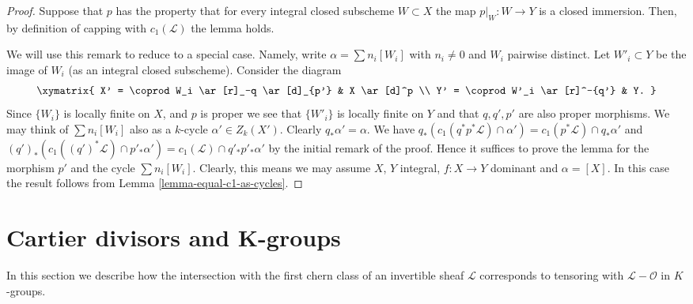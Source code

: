 \begin{proof}
Suppose that $p$ has the property that for every integral
closed subscheme $W \subset X$ the map $p|_W : W \to Y$
is a closed immersion. Then, by definition of capping
with $c_1(\mathcal{L})$ the lemma holds.

\medskip\noindent
We will use this remark to reduce to a special case. Namely,
write $\alpha = \sum n_i[W_i]$ with $n_i \not = 0$ and $W_i$ pairwise
distinct. Let $W'_i \subset Y$ be the image of $W_i$ (as an integral
closed subscheme). Consider the diagram
$$
\xymatrix{
X' = \coprod W_i \ar[r]_-q \ar[d]_{p'} & X \ar[d]^p \\
Y' = \coprod W'_i \ar[r]^-{q'} & Y.
}
$$
Since $\{W_i\}$ is locally finite on $X$, and $p$ is proper
we see that $\{W'_i\}$ is locally finite on $Y$ and that
$q, q', p'$ are also proper morphisms.
We may think of $\sum n_i[W_i]$ also as a $k$-cycle
$\alpha' \in Z_k(X')$. Clearly $q_*\alpha' = \alpha$.
We have
$q_*(c_1(q^*p^*\mathcal{L}) \cap \alpha')
= c_1(p^*\mathcal{L}) \cap q_*\alpha'$
and
$(q')_*(c_1((q')^*\mathcal{L}) \cap p'_*\alpha') =
c_1(\mathcal{L}) \cap q'_*p'_*\alpha'$ by the initial
remark of the proof. Hence it suffices to prove the lemma
for the morphism $p'$ and the cycle $\sum n_i[W_i]$.
Clearly, this means we may assume $X$, $Y$ integral,
$f : X \to Y$ dominant and $\alpha = [X]$.
In this case the result follows from
Lemma \ref{lemma-equal-c1-as-cycles}.
\end{proof}














\section{Cartier divisors and K-groups}
\label{section-cartier-coherent}

\noindent
In this section we describe how the intersection with the
first chern class of an invertible sheaf $\mathcal{L}$
corresponds to tensoring with $\mathcal{L} - \mathcal{O}$
in $K$-groups.

